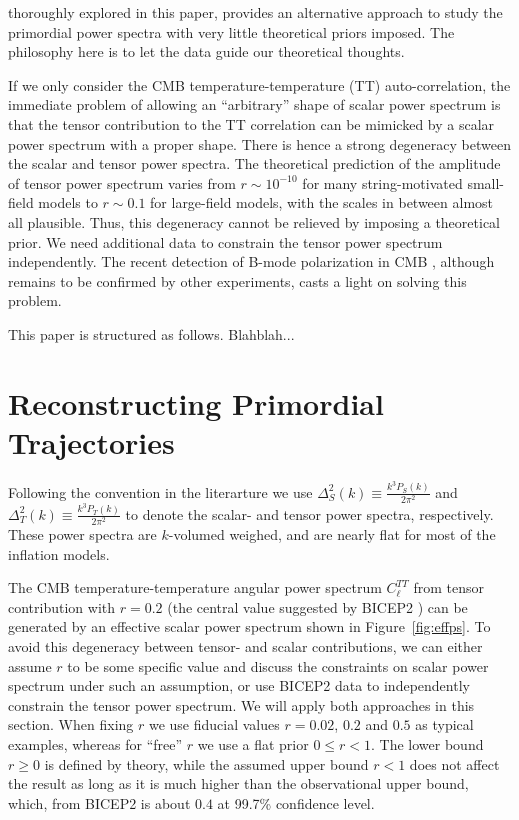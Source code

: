\documentclass[11pt]{article}
\begin{document}
thoroughly explored in this paper, provides an alternative approach to study the primordial power spectra with very little theoretical priors imposed. The philosophy here is to let the data guide our theoretical thoughts.

If we only consider the CMB temperature-temperature (TT) auto-correlation, the immediate problem of allowing an ``arbitrary'' shape of scalar power spectrum is that the tensor contribution to the TT correlation can be mimicked by a scalar power spectrum with a proper shape. There is hence a strong degeneracy between the scalar and tensor power spectra. The theoretical prediction of the amplitude of tensor power spectrum varies from $r\sim 10^{-10}$ for many string-motivated small-field models to  $r\sim 0.1$ for large-field models, with the scales in between almost all plausible. Thus, this degeneracy cannot be relieved by imposing a theoretical prior. We need additional data to constrain the tensor power spectrum independently. The recent detection of B-mode polarization in CMB \cite{BICEP2}, although remains to be confirmed by other experiments, casts a light on solving this problem.

This paper is structured as follows. Blahblah...

\section{Reconstructing Primordial Trajectories}

Following the convention in the literarture we use $\Delta^2_{S}(k) \equiv \frac{k^3P_S(k)}{2\pi^2}$ and $\Delta^2_T(k) \equiv \frac{k^3P_T(k)}{2\pi^2}$ to denote the scalar- and tensor power spectra, respectively. These power spectra are $k$-volumed weighed, and are nearly flat for most of the inflation models.

The CMB temperature-temperature angular power spectrum $C_\ell^{TT}$ from tensor contribution with $r=0.2$ (the central value suggested by BICEP2 \cite{BICEP2}) can be generated by an effective scalar power spectrum shown in Figure~\ref{fig:effps}. To avoid this degeneracy between tensor- and scalar contributions, we can either assume $r$ to be some specific value and discuss the constraints on scalar power spectrum under such an assumption, or use BICEP2 data to independently constrain the tensor power spectrum. We will apply both approaches in this section. When fixing $r$ we use fiducial values $r=0.02$,  $0.2$ and $0.5$ as typical examples, whereas for ``free'' $r$ we use a flat prior $0\le r < 1$. The lower bound $r\ge 0$ is defined by theory, while the assumed upper bound $r<1$ does not affect the result as long as it is much higher than the observational upper bound, which, from BICEP2 is about $0.4$ at 99.7\% confidence level.   
\end{document}
